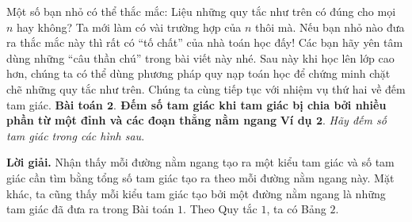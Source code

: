 	Một số bạn nhỏ có thể thắc mắc: Liệu những quy tắc như trên có đúng cho mọi $n$ hay không? Ta mới làm có vài trường hợp của $n$ thôi mà. Nếu bạn nhỏ nào đưa ra thắc mắc này thì rất có “tố chất” của nhà toán học đấy! Các bạn hãy yên tâm dùng những “câu thần chú” trong bài viết này nhé. Sau này khi học lên lớp cao hơn, chúng ta có thể dùng phương pháp quy nạp toán học để chứng minh chặt chẽ những quy tắc như trên.
	\vskip 0.1cm
	Chúng ta cùng tiếp tục với nhiệm vụ thứ hai về đếm tam giác.
	\vskip 0.1cm
	\textbf{\color{toancuabi}Bài toán $\pmb{2.}$ Đếm số tam giác khi tam giác bị chia bởi nhiều phần từ một đỉnh và các đoạn thẳng nằm ngang}
	\vskip 0.1cm
	\textbf{\color{toancuabi}Ví dụ $\pmb{2.}$} \textit{Hãy đếm số tam giác trong các hình sau}.
	\begin{figure}[H]
		\centering
		\vspace*{-5pt}
		\captionsetup{labelformat= empty, justification=centering}
		\captionsetup[subfigure]{labelformat=empty}
		\hfill{}
		\hfill
		\hfill
		\hfill
		\vspace*{-10pt}
	\end{figure}    
	\textbf{\color{toancuabi}Lời giải.} Nhận thấy mỗi đường nằm ngang tạo ra một kiểu tam giác và số tam giác cần tìm bằng tổng số tam giác tạo ra theo mỗi đường nằm ngang này. Mặt khác, ta cũng thấy mỗi kiểu tam giác tạo bởi một đường nằm ngang là những tam giác đã đưa ra trong Bài toán $1$.
	\vskip 0.1cm
	Theo Quy tắc $1$, ta có Bảng $2$.
